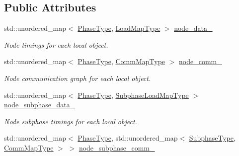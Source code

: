 \subsection*{Public Attributes}
\begin{DoxyCompactItemize}
\item 
std\+::unordered\+\_\+map$<$ \hyperlink{namespacevt_a46ce6733d5cdbd735d561b7b4029f6d7}{Phase\+Type}, \hyperlink{namespacevt_1_1vrt_1_1collection_1_1balance_a824290c4323836ba7541a39845a200c3}{Load\+Map\+Type} $>$ \hyperlink{structvt_1_1vrt_1_1collection_1_1balance_1_1_stats_data_a34a782537ef1b33bfc1c7b1f635e1c72}{node\+\_\+data\+\_\+}
\begin{DoxyCompactList}\small\item\em Node timings for each local object. \end{DoxyCompactList}\item 
std\+::unordered\+\_\+map$<$ \hyperlink{namespacevt_a46ce6733d5cdbd735d561b7b4029f6d7}{Phase\+Type}, \hyperlink{namespacevt_1_1vrt_1_1collection_1_1balance_a10860c956804d644db54a16012352728}{Comm\+Map\+Type} $>$ \hyperlink{structvt_1_1vrt_1_1collection_1_1balance_1_1_stats_data_a5ee2aea35e48a4855c8f99c16b588287}{node\+\_\+comm\+\_\+}
\begin{DoxyCompactList}\small\item\em Node communication graph for each local object. \end{DoxyCompactList}\item 
std\+::unordered\+\_\+map$<$ \hyperlink{namespacevt_a46ce6733d5cdbd735d561b7b4029f6d7}{Phase\+Type}, \hyperlink{namespacevt_1_1vrt_1_1collection_1_1balance_a8bdadb2583f128dd256e7d5a10826542}{Subphase\+Load\+Map\+Type} $>$ \hyperlink{structvt_1_1vrt_1_1collection_1_1balance_1_1_stats_data_ab4c0793fa752d0404dc52ccb95be0285}{node\+\_\+subphase\+\_\+data\+\_\+}
\begin{DoxyCompactList}\small\item\em Node subphase timings for each local object. \end{DoxyCompactList}\item 
std\+::unordered\+\_\+map$<$ \hyperlink{namespacevt_a46ce6733d5cdbd735d561b7b4029f6d7}{Phase\+Type}, std\+::unordered\+\_\+map$<$ \hyperlink{namespacevt_ae78cbfdf1e57470e33eedb074f2beeba}{Subphase\+Type}, \hyperlink{namespacevt_1_1vrt_1_1collection_1_1balance_a10860c956804d644db54a16012352728}{Comm\+Map\+Type} $>$ $>$ \hyperlink{structvt_1_1vrt_1_1collection_1_1balance_1_1_stats_data_ac78802ff554a4d802a163afa5756412e}{node\+\_\+subphase\+\_\+comm\+\_\+}

\end{DoxyCompactItemize}
